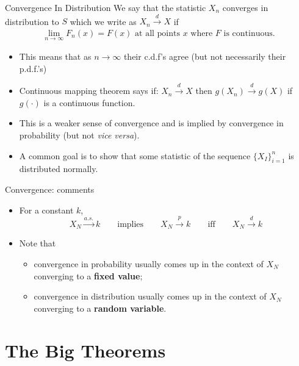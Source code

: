 \begin{frame}{Convergence In Distribution}
We say that the statistic $X_n$ \alert{converges in distribution} to $S$ which we write as $X_n \overset{d}{\to} X$ if
\begin{align*}
\lim_{n\rightarrow \infty} F_n(x) =F(x) \text{ at all points $x$ where } F \text{ is continuous}.
\end{align*}
\begin{itemize}
	\item This means that as $n \rightarrow \infty$ their c.d.f's agree (but not necessarily their p.d.f.'s)
		\item Continuous mapping theorem says if: $X_n \overset{d}{\to} X$ then $g(X_n) \overset{d}{\to} g(X)$ if $g(\cdot)$ is a continuous function.
		\item This is a \alert{weaker} sense of convergence and is implied by \alert{convergence in probability} (but not \textit{vice versa}).
		\item A common goal is to show that some statistic of the sequence $\{X_I\}_{i=1}^n$ is distributed normally.
\end{itemize}
\end{frame}




\begin{frame}{Convergence: comments}

\begin{itemize}
\item For a constant $k$,
\[
	X_N \overset{a.s.}{\rightarrow} k \qquad \text{implies} \qquad  X_N \overset{p}{\rightarrow} k \qquad \text{iff} \qquad X_N \overset{d}{\rightarrow}  k
\]

\item Note that 
	\begin{itemize}	
		\item convergence in probability usually comes up in the context of $X_N$ converging to a {\bf fixed value}; 
		\item convergence in distribution usually comes up in the context of $X_N$ converging to a {\bf random variable}.	
			
	\end{itemize}
	
\end{itemize}

\end{frame}



\section{The Big Theorems}

